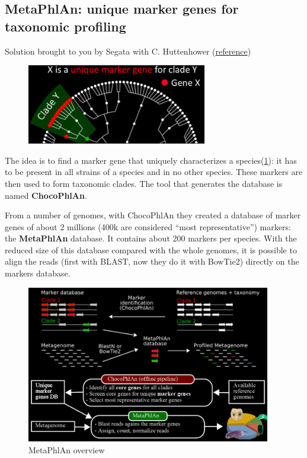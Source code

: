 \subsection{MetaPhlAn: unique marker genes for taxonomic profiling}

Solution brought to you by Segata with C. Huttenhower (\href{http://segatalab.cibio.unitn.it/tools/metaphlan/index.html}{reference})

\begin{figure}[!h]
\centering
\includegraphics[width=0.7\textwidth]{markerGene.png}
\caption{\label{fig:markerGene}}
\end{figure}

The idea is to find a marker gene that uniquely characterizes a species(\ref{fig:markerGene}): it has to be present in all strains of a species and in no other species. These markers are then used to form taxonomic clades. The tool that generates the database is named \textbf{ChocoPhlAn}.

From a number of genomes, with ChocoPhlAn they created a database of marker genes of about 2 millions (400k are considered “most representative”) markers: the \textbf{MetaPhlAn} database. It contains about 200 markers per species. With the reduced size of this database compared with the whole genomes, it is possible to align the reads (first with BLAST, now they do it with BowTie2) directly on the markers database. 

\begin{figure}[!h]
\centering
\includegraphics[width=0.95\textwidth]{MetaPhlAn.png}
\caption{\label{fig:metaphlan}MetaPhlAn overview}
\end{figure}


